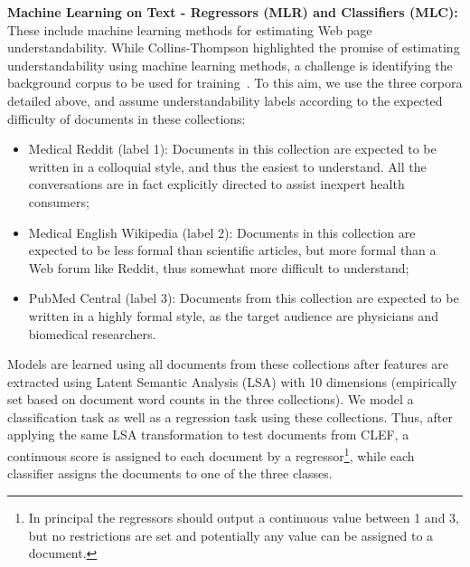 


\textbf{Machine Learning on Text - Regressors (MLR) and Classifiers (MLC):} These include machine learning methods for estimating Web page understandability. While Collins-Thompson highlighted the promise of estimating understandability using machine learning methods, a challenge is identifying the background corpus to be used for training~\cite{collins2014computational}. To this aim, we use the three corpora detailed above, and assume understandability labels according to the expected difficulty of documents in these collections:

\begin{itemize}[leftmargin=*]
    \item Medical Reddit (label 1): Documents in this collection are expected to be written in a colloquial style, and thus the easiest to understand. All the conversations are in fact explicitly directed to assist inexpert health consumers;
    \item Medical English Wikipedia (label 2): Documents in this collection are expected to be less formal than scientific articles, but more formal than a Web forum like Reddit, thus somewhat more difficult to understand;
    \item PubMed Central (label 3): Documents from this collection are expected to be written in a highly formal style, as the target audience are physicians and biomedical researchers.
\end{itemize}

Models are learned using all documents from these collections after features are extracted using Latent Semantic Analysis (LSA) with 10 dimensions (empirically set based on document word counts in the three collections). We model a classification task as well as a regression task using these collections. Thus, after applying the same LSA transformation to test documents from CLEF, a continuous score is assigned to each document by a regressor\footnote{In principal the regressors should output a continuous value between 1 and 3, but no restrictions are set and potentially any value can be assigned to a document.}, while each classifier assigns the documents to one of the three classes.





